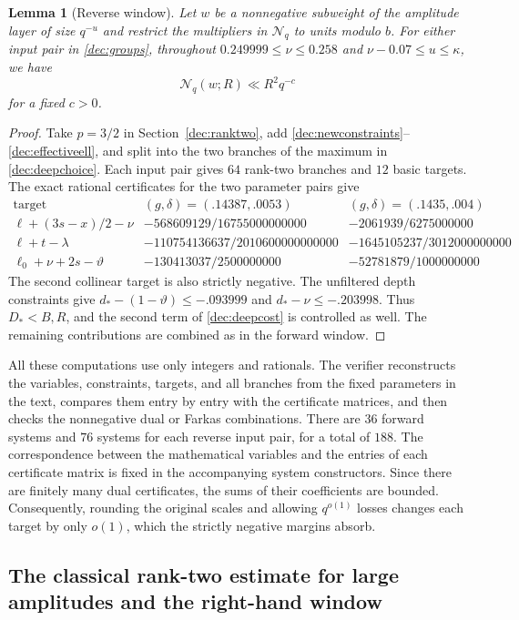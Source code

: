 \documentclass[11pt,a4paper]{article}
\theoremstyle{paperplain}
\newtheorem{lemma}[theorem]{Lemma}
\numberwithin{equation}{section}
\begin{document}
\begin{lemma}[Reverse window]\label{dec:reverselemma}
Let $w$ be a nonnegative subweight of the amplitude layer of size
$q^{-u}$ and restrict the multipliers in $\mathcal N_q$ to units
modulo $b$. For either input pair in \eqref{dec:groups}, throughout
$0.249999\le\nu\le0.258$ and $\nu-0.07\le u\le\kappa$, we have
\[
 \mathcal N_q(w;R)\ll R^2q^{-c}
\]
for a fixed $c>0$.
\end{lemma}
\begin{proof}
Take $p=3/2$ in Section~\ref{dec:ranktwo}, add
\eqref{dec:newconstraints}--\eqref{dec:effectiveell}, and split into
the two branches of the maximum in \eqref{dec:deepchoice}.
Each input pair gives $64$ rank-two branches and $12$ basic targets.
The exact rational certificates for the two parameter pairs give
\[
\begin{array}{c|c|c}
 \text{target}&(g,\delta)=(.14387,.0053)&(g,\delta)=(.1435,.004)\\ \hline
 \ell+(3s-x)/2-\nu&-568609129/16755000000000&-2061939/6275000000\\
 \ell+t-\lambda&-110754136637/2010600000000000&-1645105237/3012000000000\\
 \ell_0+\nu+2s-\vartheta&-130413037/2500000000&-52781879/1000000000
\end{array}
\]
The second collinear target is also strictly negative.
The unfiltered depth constraints give
$d_*-(1-\vartheta)\le-.093999$ and $d_*-\nu\le-.203998$.
Thus $D_*<B,R$, and the second term of \eqref{dec:deepcost}
is controlled as well. The remaining contributions are combined
as in the forward window.
\end{proof}

All these computations use only integers and rationals.
The verifier reconstructs the variables, constraints, targets, and all
branches from the fixed parameters in the text, compares them entry by
entry with the certificate matrices, and then checks the nonnegative
dual or Farkas combinations. There are $36$ forward systems and $76$
systems for each reverse input pair, for a total of $188$.
The correspondence between the mathematical variables and the entries
of each certificate matrix is fixed in the accompanying system constructors.
Since there are finitely many dual certificates, the sums of their
coefficients are bounded.
Consequently, rounding the original scales and allowing $q^{o(1)}$
losses changes each target by only $o(1)$, which the strictly negative
margins absorb.

\subsection{The classical rank-two estimate for large amplitudes and the right-hand window}
\label{dec:oldranktwo}
\end{document}

